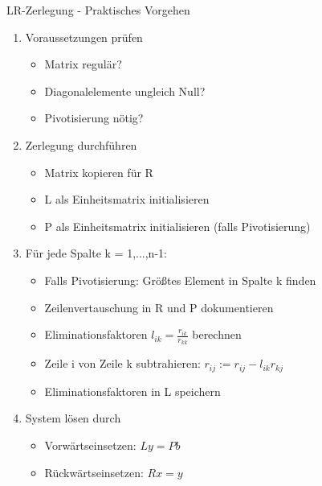 \begin{KR}{LR-Zerlegung - Praktisches Vorgehen}
\begin{enumerate}
    \item Voraussetzungen prüfen
    \begin{itemize}
        \item Matrix regulär?
        \item Diagonalelemente ungleich Null?
        \item Pivotisierung nötig?
    \end{itemize}

    \item Zerlegung durchführen
    \begin{itemize}
        \item Matrix kopieren für R
        \item L als Einheitsmatrix initialisieren
        \item P als Einheitsmatrix initialisieren (falls Pivotisierung)
    \end{itemize}

    \item Für jede Spalte k = 1,...,n-1:
    \begin{itemize}
        \item Falls Pivotisierung: Größtes Element in Spalte k finden
        \item Zeilenvertauschung in R und P dokumentieren
        \item Eliminationsfaktoren $l_{ik} = \frac{r_{ik}}{r_{kk}}$ berechnen
        \item Zeile i von Zeile k subtrahieren: $r_{ij} := r_{ij} - l_{ik}r_{kj}$
        \item Eliminationsfaktoren in L speichern
    \end{itemize}

    \item System lösen durch
    \begin{itemize}
        \item Vorwärtseinsetzen: $Ly = Pb$
        \item Rückwärtseinsetzen: $Rx = y$
    \end{itemize}
\end{enumerate}
\end{KR}

